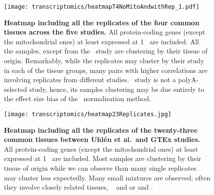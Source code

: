 \begin{figure}[htpb]
    \texttt{[image: transcriptomics/heatmapT4NoMitoAndwithRep\_1.pdf]}\centering
    \caption[Heatmap including all the replicates of the 4 common tissues
    across the 5 studies]{\label{fig:noMitoRep4T}\textbf{Heatmap including all
    the replicates of the four common tissues across the five studies.}
    All protein-coding genes (except the mitochondrial ones)
    at least expressed at 1 \FPKM\ are included. All the samples, except from the
    \castle\ study are clustering by their tissue of origin.
    Remarkably, while the replicates may cluster by their study in each of the
    tissue groups, many pairs with higher correlations are involving replicates
    from different studies. \castle\ study is not a polyA-selected study, hence,
    its samples clustering may be due entirely to the effect size bias of the
    \FPKM\ normalisation method.}
\end{figure}

\begin{figure}[htpb]
    \texttt{[image: transcriptomics/heatmap23Replicates.jpg]}\centering
    \caption[Heatmap including all the replicates of the 23 common tissues
    between Uhlén and GTEx studies]{\label{fig:noMitoRep23T}\textbf{Heatmap
    including all the replicates of the twenty-three common tissues between
    Uhlén et al.\ and GTEx studies.} All protein-coding genes (except the mitochondrial ones)
    at least expressed at 1 \FPKM\ are included. Most samples are clustering by
    their tissue of origin while we can observe than many single replicates may
    cluster less expectedly. Many small mixtures are observed; often they involve
    closely related tissues, \ie\  and  or
     and .}
\end{figure}



